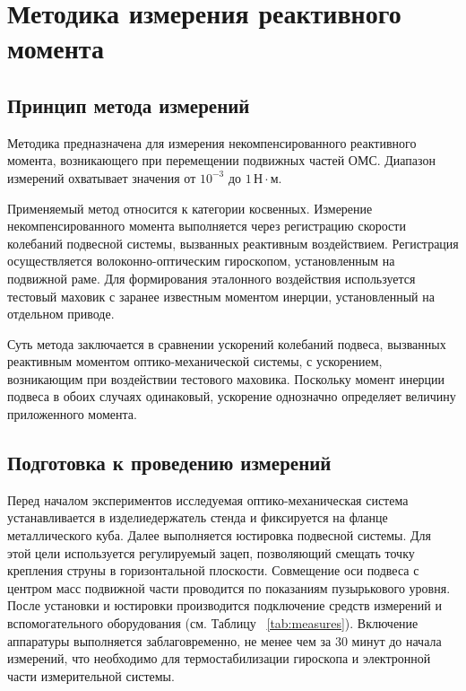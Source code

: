 \section{Методика измерения реактивного момента}

\subsection{Принцип метода измерений}

Методика предназначена для измерения некомпенсированного реактивного момента, возникающего при перемещении подвижных частей ОМС. Диапазон измерений охватывает значения от $10^{-3}$ до $1 \,\text{Н}\cdot\text{м}$.

Применяемый метод относится к категории косвенных. Измерение некомпенсированного момента выполняется через регистрацию скорости колебаний подвесной системы, вызванных реактивным воздействием. Регистрация осуществляется волоконно-оптическим гироскопом, установленным на подвижной раме. Для формирования эталонного воздействия используется тестовый маховик с заранее известным моментом инерции, установленный на отдельном приводе.

Суть метода заключается в сравнении ускорений колебаний подвеса, вызванных реактивным моментом оптико-механической системы, с ускорением, возникающим при воздействии тестового маховика. Поскольку момент инерции подвеса в обоих случаях одинаковый, ускорение однозначно определяет величину приложенного момента. 



\subsection{Подготовка к проведению измерений}

Перед началом экспериментов исследуемая оптико-механическая система устанавливается в изделиедержатель стенда и фиксируется на фланце металлического куба. Далее выполняется юстировка подвесной системы. Для этой цели используется регулируемый зацеп, позволяющий смещать точку крепления струны в горизонтальной плоскости. Совмещение оси подвеса с центром масс подвижной части проводится по показаниям пузырькового уровня. После установки и юстировки производится подключение средств измерений и вспомогательного оборудования (см. Таблицу ~\cref{tab:measures}). Включение аппаратуры выполняется заблаговременно, не менее чем за 30 минут до начала измерений, что необходимо для термостабилизации гироскопа и электронной части измерительной системы.

